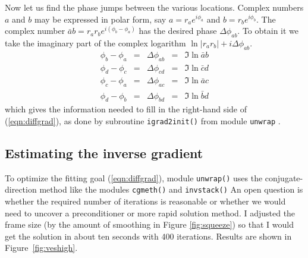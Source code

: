 Now let us find the phase jumps between the various locations. Complex numbers $a$ and $b$ may be expressed in polar form, say $a=r_ae^{i\phi_a}$ and $b=r_be^{i\phi_b}$.
The complex number 
$\bar a b = r_a r_b e^{i(\phi_b-\phi_a)}$ has the desired phase
$\Delta \phi_{ab}$.
To obtain it we take the imaginary part of the complex logarithm
$\ln |r_a r_b| + i\Delta \phi_{ab}$.
\begin{equation}
  \begin{array}{lllll}
        \phi_b-\phi_a &=& \Delta \phi_{ab} &=& \Im \ln  \bar a b\\
        \phi_d-\phi_c &=& \Delta \phi_{cd} &=& \Im \ln  \bar c d\\
        \phi_c-\phi_a &=& \Delta \phi_{ac} &=& \Im \ln  \bar a c\\
        \phi_d-\phi_b &=& \Delta \phi_{bd} &=& \Im \ln  \bar b d
  \end{array}
\label{eqn:thedeltas}
\end{equation}
which gives the information needed to fill in the right-hand side of
(\ref{eqn:diffgrad}), as done by subroutine \texttt{igrad2init()} from
module \texttt{unwrap} .
\subsection{Estimating the inverse gradient}
To optimize the fitting goal (\ref{eqn:diffgrad}),
module \texttt{unwrap()} uses the conjugate-direction method
like the modules \texttt{cgmeth()}
and 
\texttt{invstack()}
An open question is whether the required number of iterations is reasonable
or whether we would need to uncover a preconditioner
or more rapid solution method.
I adjusted the frame size 
(by the amount of smoothing in Figure \ref{fig:squeeze})
so that I would get the solution in about ten seconds with 400 iterations.
Results are shown in Figure~\ref{fig:veshigh}.

\begin{comment}
When we are working with figures like Figure~\ref{fig:veshigh},
the number of iterations often exceeds the number of intermediate
output frames that we care to deal with.
The computer function \texttt{klick()} is a simple tool
to detect logarithmically spaced intervals for taking snapshots
of iterative descent.
\progdex{klick}{Logarithmic increment detect}
\end{comment}

